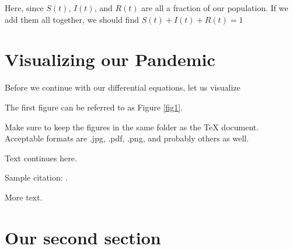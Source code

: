 \documentclass{amsart}
\theoremstyle{definition}
\numberwithin{equation}{section}
\begin{document}
\begin{sansmath}
Here, since $S(t)$, $I(t)$, and $R(t)$ are all a fraction of our population. If we add them all together, we should find $S(t) + I(t) + R(t) = 1$

\section{Visualizing our Pandemic}

Before we continue with our differential equations, let us visualize 



\newpage

%





The first figure can be referred to as  Figure \ref{fig1}.

Make sure to keep the figures in the same folder as the TeX document.
Acceptable formats are .jpg, .pdf, .png, and probably others as well.

Text continues here.

Sample citation:  \cite{alexandrov}.

More text.

\section{Our second section}


\end{sansmath}
\end{document}
